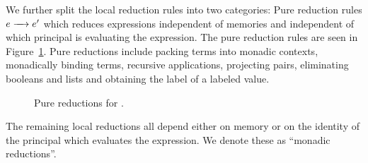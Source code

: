 We further split the local reduction rules into two categories: Pure reduction rules $\steppure{\expr}{\expr'}$ which reduces expressions independent of memories and independent of which principal is evaluating the expression. The pure reduction rules are seen in Figure~\ref{fig:pure-reductions}. Pure reductions include packing terms into monadic contexts, monadically binding terms, recursive applications, projecting pairs, eliminating booleans and lists and obtaining the label of a labeled value.

\begin{figure}
    \centering
    \caption{Pure reductions for \lang.}
    \label{fig:pure-reductions}
\end{figure}

The remaining local reductions all depend either on memory or on the identity of the principal which evaluates the expression. We denote these as ``monadic reductions''.


